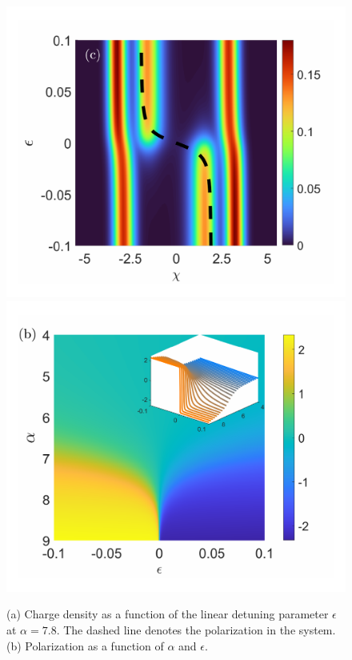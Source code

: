 \documentclass[prb,twocolumn,showpacs,preprintnumbers,amsmath,amssymb, superscriptaddress]{revtex4-2}
\newcommand{\1}{{1\hspace*{-0.5ex} \textrm{l} \hspace*{0.5ex}}}
\begin{document}
\begin{figure}[h!]
	\begin{center}
		\includegraphics[width=1\columnwidth]{Fig_Polarization_2D}
		\includegraphics[width=1\columnwidth]{Fig_Polarization_3D_theor}
		\caption{(a) Charge density as a function of the linear detuning parameter $\epsilon$ at $\alpha = 7.8$. The dashed line denotes the polarization in the system. (b) Polarization as a function of $\alpha$ and $\epsilon$.}
	\end{center}
\end{figure}
     
\end{document}

